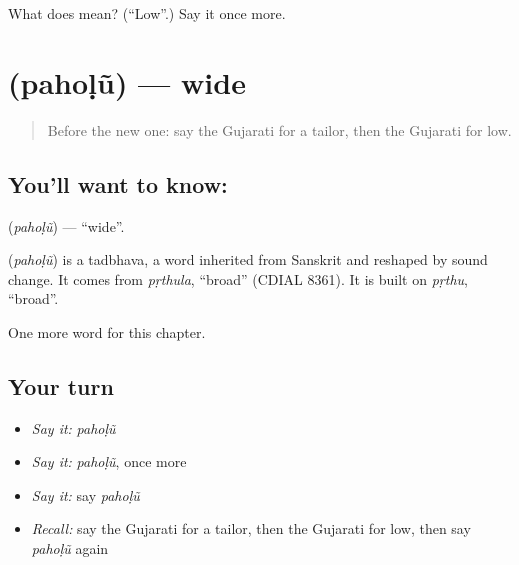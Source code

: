 \begin{tcolorbox}[breakable,colback=teal!4,colframe=teal!35!black,title={Before you move on}]
What does  mean? (\textquotedblleft{}Low\textquotedblright{}.) Say it once more.
\end{tcolorbox}
\section[\texorpdfstring{\gu{પહોળું} (pahoḷũ)}{પહોળું (pahoḷũ)}]{ (pahoḷũ) — wide}

\label{lesson:GU-C131-paholu}



\begin{quote}
Before the new one: say the Gujarati for a tailor, then the Gujarati for low.
\end{quote}

\subsection*{You'll want to know: }
\textbf{} (\emph{pahoḷũ}) — \textquotedblleft{}wide\textquotedblright{}.

\begin{cousinweb}
\textbf{} (\emph{pahoḷũ}) is a tadbhava, a word inherited from Sanskrit and reshaped by sound change. It comes from \emph{pṛthula}, \textquotedblleft{}broad\textquotedblright{} (CDIAL 8361). It is built on \emph{pṛthu}, \textquotedblleft{}broad\textquotedblright{}.
\end{cousinweb}

\begin{grammarlens}[title={What you've built}]
One more word for this chapter.
\end{grammarlens}

\subsection*{Your turn}
\begin{itemize}
\raggedright
  \item \emph{Say it:} \emph{pahoḷũ}
  \item \emph{Say it:} \emph{pahoḷũ}, once more
  \item \emph{Say it:} say \emph{pahoḷũ}
  \item \emph{Recall:} say the Gujarati for a tailor, then the Gujarati for low, then say \emph{pahoḷũ} again
\end{itemize}

